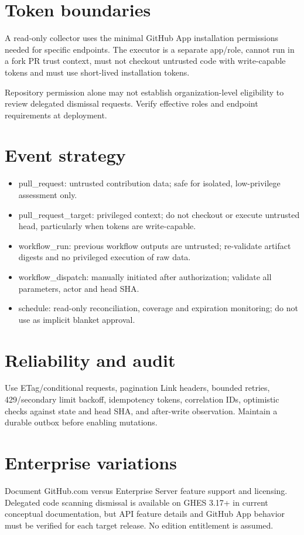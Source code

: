 \documentclass[11pt,letterpaper]{article}
\begin{document}
\section{Token boundaries}
A read-only collector uses the minimal GitHub App installation permissions needed for specific endpoints. The executor is a separate app/role, cannot run in a fork PR trust context, must not checkout untrusted code with write-capable tokens and must use short-lived installation tokens.

Repository permission alone may not establish organization-level eligibility to review delegated dismissal requests. Verify effective roles and endpoint requirements at deployment.


\section{Event strategy}
\begin{itemize}
\item pull\_request: untrusted contribution data; safe for isolated, low-privilege assessment only.
\item pull\_request\_target: privileged context; do not checkout or execute untrusted head, particularly when tokens are write-capable.
\item workflow\_run: previous workflow outputs are untrusted; re-validate artifact digests and no privileged execution of raw data.
\item workflow\_dispatch: manually initiated after authorization; validate all parameters, actor and head SHA.
\item schedule: read-only reconciliation, coverage and expiration monitoring; do not use as implicit blanket approval.
\end{itemize}

\section{Reliability and audit}
Use ETag/conditional requests, pagination Link headers, bounded retries, 429/secondary limit backoff, idempotency tokens, correlation IDs, optimistic checks against state and head SHA, and after-write observation. Maintain a durable outbox before enabling mutations.


\section{Enterprise variations}
Document GitHub.com versus Enterprise Server feature support and licensing. Delegated code scanning dismissal is available on GHES 3.17+ in current conceptual documentation, but API feature details and GitHub App behavior must be verified for each target release. No edition entitlement is assumed.
\end{document}
